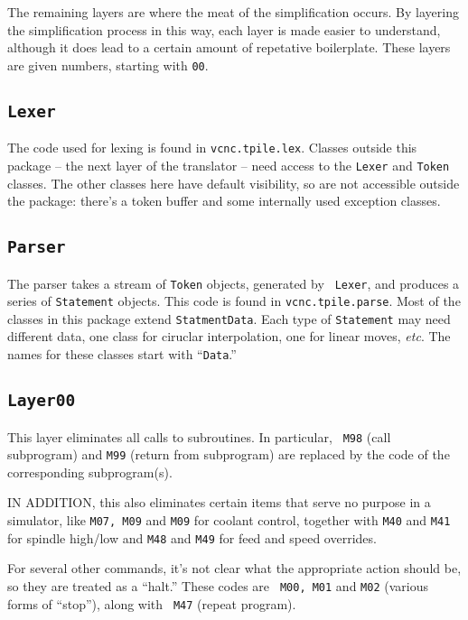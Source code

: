 \documentclass[titlepage,oneside,10pt]{article}
\begin{document}
The remaining layers are where the meat of the simplification
occurs. By layering the simplification process in this way, each layer
is made easier to understand, although it does lead to a certain
amount of repetative boilerplate. These layers are given numbers,
starting with {\tt 00}.

\subsection{\tt Lexer}

The code used for lexing is found in {\tt vcnc.tpile.lex}. Classes outside
this package -- the next layer of the translator -- need access to the
{\tt Lexer} and {\tt Token} classes. The other classes here have
default visibility, so are not accessible outside the package: there's
a token buffer and some internally used exception classes.

\subsection{\tt Parser}

The parser takes a stream of {\tt Token} objects, generated by {\tt
  Lexer}, and produces a series of {\tt Statement} objects. This code
is found in {\tt vcnc.tpile.parse}. Most of the classes in this
package extend {\tt StatmentData}. Each type of {\tt Statement} may
need different data, one class for ciruclar interpolation, one for
linear moves, \emph{etc}. The names for these classes start with
``{\tt Data}.''


\subsection{\tt Layer00}

This layer eliminates all calls to subroutines. In particular, {\tt
  M98} (call subprogram) and {\tt M99} (return from subprogram) are
replaced by the code of the corresponding subprogram(s).

IN ADDITION, this also eliminates certain items that serve no purpose
in a simulator, like {\tt M07, M09} and {\tt M09} for coolant
control, together with {\tt M40} and {\tt M41} for spindle high/low
and {\tt M48} and {\tt M49} for feed and speed overrides.

For several other commands, it's not clear what the appropriate action
should be, so they are treated as a ``halt.'' These codes are {\tt
  M00, M01} and {\tt M02} (various forms of ``stop''), along with {\tt
  M47} (repeat program).
\end{document}
